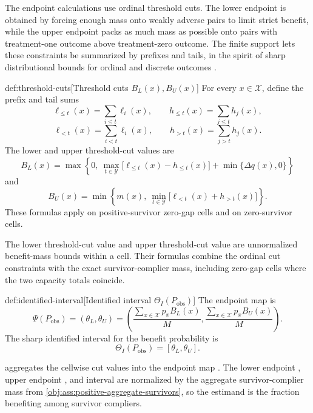 \documentclass[11pt]{article}
\begin{document}
The endpoint calculations use ordinal threshold cuts. The lower endpoint is obtained by forcing enough mass onto weakly adverse pairs to limit strict benefit, while the upper endpoint packs as much mass as possible onto pairs with treatment-one outcome above treatment-zero outcome. The finite support lets these constraints be summarized by prefixes and tails, in the spirit of sharp distributional bounds for ordinal and discrete outcomes \citep{Makarov1982, WilliamsonDowns1990, FanPark2010}.

\begin{definitionv}{def:threshold-cuts}[Threshold cuts \(B_L(x),B_U(x)\)]
For every \(x\in\mathcal X\), define the prefix and tail sums
\[
\ell_{\le t}(x)=\sum_{i\le t}\ell_i(x),
\qquad
h_{\le t}(x)=\sum_{j\le t}h_j(x),
\]
\[
\ell_{<t}(x)=\sum_{i<t}\ell_i(x),
\qquad
h_{>t}(x)=\sum_{j>t}h_j(x).
\]
The lower and upper threshold-cut values are
\[
B_L(x)
=
\max\left\{
0,\
\max_{t\in\mathcal Y}\bigl[\ell_{\le t}(x)-h_{\le t}(x)\bigr]
+\min\{\Delta q(x),0\}
\right\}
\]
and
\[
B_U(x)
=
\min\left\{
m(x),\
\min_{t\in\mathcal Y}\bigl[\ell_{<t}(x)+h_{>t}(x)\bigr]
\right\}.
\]
These formulas apply on positive-survivor zero-gap cells and on zero-survivor cells.
\end{definitionv}

The lower threshold-cut value  and upper threshold-cut value  are unnormalized benefit-mass bounds within a cell. Their formulas combine the ordinal cut constraints with the exact survivor-complier mass, including zero-gap cells where the two capacity totals coincide.

\begin{definitionv}{def:identified-interval}[Identified interval \(\Theta_I(P_{\mathrm{obs}})\)]
The endpoint map is
\[
\Psi(P_{\mathrm{obs}})
=
(\theta_L,\theta_U)
=
\left(
\frac{\sum_{x\in\mathcal X}p_xB_L(x)}{M},
\frac{\sum_{x\in\mathcal X}p_xB_U(x)}{M}
\right).
\]
The sharp identified interval for the benefit probability is
\[
\Theta_I(P_{\mathrm{obs}})=[\theta_L,\theta_U].
\]
\end{definitionv}

 aggregates the cellwise cut values into the endpoint map . The lower endpoint , upper endpoint , and interval  are normalized by the aggregate survivor-complier mass from \cref{obj:ass:positive-aggregate-survivors}, so the estimand is the fraction benefiting among survivor compliers.
\end{document}
